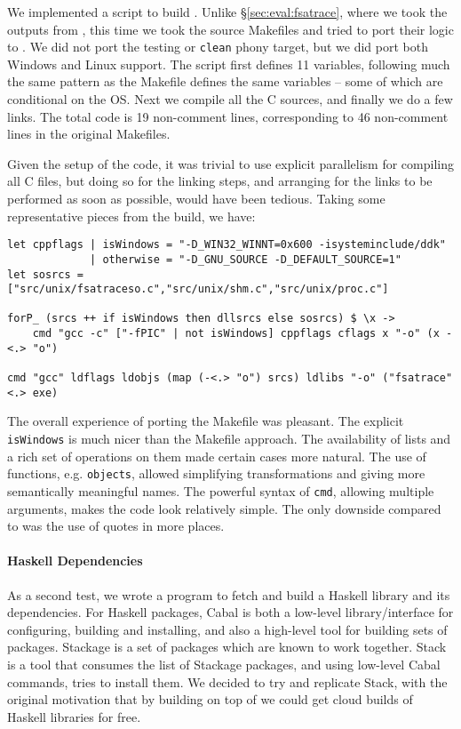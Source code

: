 We implemented a \Rattle script to build \Fsatrace. Unlike \S\ref{sec:eval:fsatrace}, where we took the outputs from \Make, this time we took the source Makefiles and tried to port their logic to \Rattle. We did not port the testing or \texttt{clean} phony target, but we did port both Windows and Linux support. The script first defines 11 variables, following much the same pattern as the Makefile defines the same variables -- some of which are conditional on the OS. Next we compile all the C sources, and finally we do a few links. The total code is 19 non-comment lines, corresponding to 46 non-comment lines in the original Makefiles.

Given the setup of the code, it was trivial to use explicit parallelism for compiling all C files, but doing so for the linking steps, and arranging for the links to be performed as soon as possible, would have been tedious. Taking some representative pieces from the build, we have:

\begin{small}
\begin{verbatim}
let cppflags | isWindows = "-D_WIN32_WINNT=0x600 -isysteminclude/ddk"
             | otherwise = "-D_GNU_SOURCE -D_DEFAULT_SOURCE=1"
let sosrcs = ["src/unix/fsatraceso.c","src/unix/shm.c","src/unix/proc.c"]

forP_ (srcs ++ if isWindows then dllsrcs else sosrcs) $ \x ->
    cmd "gcc -c" ["-fPIC" | not isWindows] cppflags cflags x "-o" (x -<.> "o")

cmd "gcc" ldflags ldobjs (map (-<.> "o") srcs) ldlibs "-o" ("fsatrace" <.> exe)
\end{verbatim}
\end{small}

The overall experience of porting the Makefile was pleasant. The explicit \texttt{isWindows} is much nicer than the Makefile approach. The  availability of lists and a rich set of operations on them made certain cases more natural. The use of functions, e.g. \texttt{objects}, allowed simplifying transformations and giving more semantically meaningful names. The powerful syntax of \texttt{cmd}, allowing multiple arguments, makes the code look relatively simple. The only downside compared to \Make was the use of quotes in more places.

\paragraph{Haskell Dependencies}

As a second test, we wrote a program to fetch and build a Haskell library and its dependencies. For Haskell packages, Cabal is both a low-level library/interface for configuring, building and installing, and also a high-level tool for building sets of packages. Stackage is a set of packages which are known to work together. Stack is a tool that consumes the list of Stackage packages, and using low-level Cabal commands, tries to install them. We decided to try and replicate Stack, with the original motivation that by building on top of \Rattle we could get cloud builds of Haskell libraries for free.

